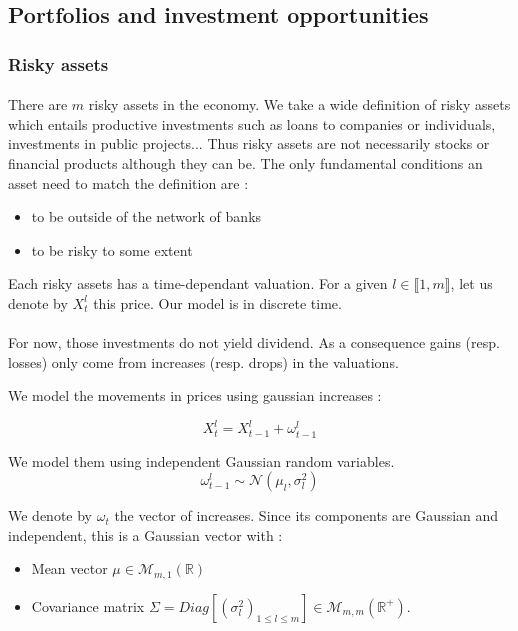 \documentclass{article}
\begin{document}
\subsection{Portfolios and investment opportunities}\label{portfolio and investment opportunities}

\subsubsection{Risky assets}

\paragraph{}
There are $m$ risky assets in the economy. We take a wide definition of risky assets which entails productive investments such as loans to companies or individuals, investments in public projects... Thus risky assets are not necessarily stocks or financial products although they can be. The only fundamental conditions an asset need to match the definition are :
\begin{itemize}
    \item to be outside of the network of banks
    \item to be risky to some extent
\end{itemize}

Each risky assets has a time-dependant valuation. For a given $l \in \llbracket 1, m \rrbracket $, let us denote by $X_t^l$ this price. Our model is in discrete time.

\paragraph{}
For now, those investments do not yield dividend. As a consequence gains (resp. losses) only come from increases (resp. drops) in the valuations. 


We model the movements in prices using gaussian increases : 

$$ X_t^l = X_{t-1}^l + \omega_{t-1}^l$$

We model them using independent Gaussian random variables.
    $$\omega_{t-1}^l \sim \mathcal{N}(\mu_l, \sigma_l^2)$$
    
We denote by $\omega_t$ the vector of increases.
Since its components are Gaussian and independent, this is a Gaussian vector with :
    \begin{itemize}
        \item Mean vector $\mu \in \mathcal{M}_{m, 1}(\mathbb{R})$
        \item Covariance matrix $\Sigma = Diag[(\sigma_l^2)_{1\leq l \leq m}] \in \mathcal{M}_{m, m}(\mathbb{R}^+)$.
    \end{itemize}
    
\end{document}
